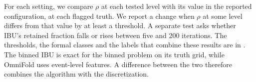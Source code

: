 For each setting, we compare $\rho$ at each tested level with its value in the reported configuration, at each flagged truth. We report a change when $\rho$ at some level differs from that value by at least a threshold. A separate test asks whether IBU's retained fraction falls or rises between five and 200 iterations. The thresholds, the formal classes and the labels that combine these results are in . The binned IBU is exact for the binned problem on its truth grid, while OmniFold uses event-level features. A difference between the two therefore combines the algorithm with the discretization.


